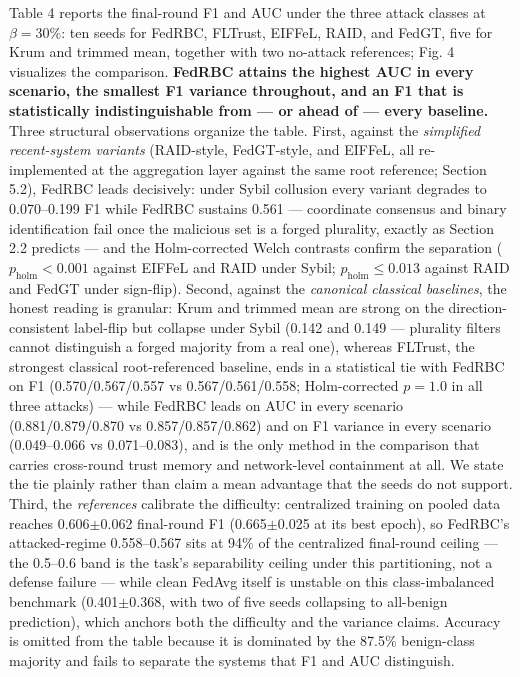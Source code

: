 \documentclass[cmc,article,submit,moreauthors,pdftex]{Definitions/tsp}
\begin{document}
Table 4 reports the final-round F1 and AUC under the three attack classes at $\beta=30\%$: ten seeds for FedRBC, FLTrust, EIFFeL, RAID, and FedGT, five for Krum and trimmed mean, together with two no-attack references; Fig. 4 visualizes the comparison. \textbf{FedRBC attains the highest AUC in every scenario, the smallest F1 variance throughout, and an F1 that is statistically indistinguishable from --- or ahead of --- every baseline.} Three structural observations organize the table. First, against the \emph{simplified recent-system variants} (RAID-style, FedGT-style, and EIFFeL, all re-implemented at the aggregation layer against the same root reference; Section 5.2), FedRBC leads decisively: under Sybil collusion every variant degrades to 0.070--0.199 F1 while FedRBC sustains 0.561 --- coordinate consensus and binary identification fail once the malicious set is a forged plurality, exactly as Section 2.2 predicts --- and the Holm-corrected Welch contrasts confirm the separation ($p_{\mathrm{holm}} < 0.001$ against EIFFeL and RAID under Sybil; $p_{\mathrm{holm}} \le 0.013$ against RAID and FedGT under sign-flip). Second, against the \emph{canonical classical baselines}, the honest reading is granular: Krum and trimmed mean are strong on the direction-consistent label-flip but collapse under Sybil (0.142 and 0.149 --- plurality filters cannot distinguish a forged majority from a real one), whereas FLTrust, the strongest classical root-referenced baseline, ends in a statistical tie with FedRBC on F1 (0.570/0.567/0.557 vs 0.567/0.561/0.558; Holm-corrected $p=1.0$ in all three attacks) --- while FedRBC leads on AUC in every scenario (0.881/0.879/0.870 vs 0.857/0.857/0.862) and on F1 variance in every scenario (0.049--0.066 vs 0.071--0.083), and is the only method in the comparison that carries cross-round trust memory and network-level containment at all. We state the tie plainly rather than claim a mean advantage that the seeds do not support. Third, the \emph{references} calibrate the difficulty: centralized training on pooled data reaches 0.606$\pm$0.062 final-round F1 (0.665$\pm$0.025 at its best epoch), so FedRBC's attacked-regime 0.558--0.567 sits at 94\% of the centralized final-round ceiling --- the 0.5--0.6 band is the task's separability ceiling under this partitioning, not a defense failure --- while clean FedAvg itself is unstable on this class-imbalanced benchmark (0.401$\pm$0.368, with two of five seeds collapsing to all-benign prediction), which anchors both the difficulty and the variance claims. Accuracy is omitted from the table because it is dominated by the 87.5\% benign-class majority and fails to separate the systems that F1 and AUC distinguish.
\end{document}
